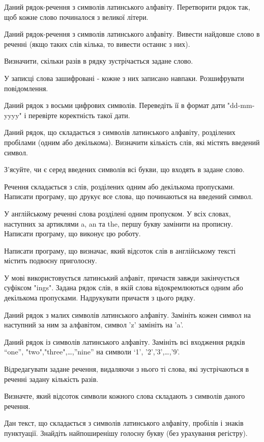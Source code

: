 \documentclass[]{article}
\begin{document}
Даний рядок-речення з символів латинського алфавіту. Перетворити рядок
так, щоб кожне слово починалося з великої літери.

Даний рядок-речення з символів латинського алфавіту. Вивести найдовше
слово в реченні (якщо таких слів кілька, то вивести останнє з них).

Визначити, скільки разів в рядку зустрічається задане слово.

\protect\hypertarget{_Hlk65949361}{}{}У записці слова зашифровані -
кожне з них записано навпаки. Розшифрувати повідомлення.

Даний рядок з восьми цифрових символів. Переведіть її в формат дати
"dd-mm-yyyy" і перевірте коректність такої дати.

Даний рядок, що складається з символів латинського алфавіту, розділених
пробілами (одним або декількома). Визначити кількість слів, які містять
введений символ.

З'ясуйте, чи є серед введених символів всі букви, що входять в задане
слово.

Речення складається з слів, розділених одним або декількома пропусками.
Написати програму, що друкує все слова, що починаються на введений
символ.

У англійському реченні слова розділені одним пропуском. У всіх словах,
наступних за артиклями a, an та the, першу букву замінити на прописну.
Написати програму, що виконує цю роботу.

Написати програму, що визначає, який відсоток слів в англійському тексті
містить подвоєну приголосну.

У мові використовується латинський алфавіт, причастя завжди закінчується
суфіксом "ings". Задана рядок слів, в якій слова відокремлюються одним
або декількома пропусками. Надрукувати причастя з цього рядку.

Даний рядок з малих символів латинського алфавіту. Замініть кожен символ
на наступний за ним за алфавітом, символ 'z' замініть на 'a'.

Даний рядок із символів латинського алфавіту. Замініть всі входження
рядків ``one'', "two","three",\ldots{},''nine'' на символи `1',
'2','3',\ldots{},'9'.

Відредагувати задане речення, видаляючи з нього ті слова, які
зустрічаються в реченні задану кількість разів.

Визначте, який відсоток символи кожного слова складають з символів
даного речення.\protect\hypertarget{_Hlk65949571}{}{}

Дан текст, що складається з символів латинського алфавіту, пробілів і
знаків пунктуації. Знайдіть найпоширенішу голосну букву (без урахування
регістру).
\end{document}
